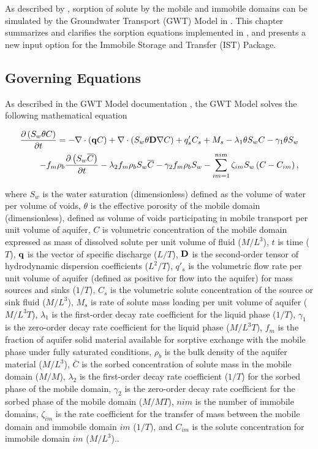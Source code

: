 
As described by \cite{modflow6gwt}, sorption of solute by the mobile and immobile domains can be simulated by the Groundwater Transport (GWT) Model in \mf.  This chapter summarizes and clarifies the sorption equations implemented in \mf, and presents a new input option for the Immobile Storage and Transfer (IST) Package.

\subsection{Governing Equations} \label{sec:goveqn1}

As described in the GWT Model documentation \citep{modflow6gwt},  the GWT Model solves the following mathematical equation

\begin{equation}
\label{eqn:gwtpde}
\begin{aligned}
\frac {\partial \left ( S_w \theta C \right )}{\partial t} = 
- \nabla \cdot \left ( \mathbf{q} C  \right ) 
+ \nabla \cdot \left ( S_w \theta \mathbf{D} \nabla C \right ) 
+ q'_s C_s + M_s  
- \lambda_1 \theta S_w C - \gamma_1 \theta S_w \\
- f_m \rho_b \frac {\partial \left ( S_w \overline{C} \right ) }{\partial t} 
- \lambda_2 f_m \rho_b S_w \overline{C} - \gamma_2 f_m \rho_b S_w 
- \sum \limits_{im=1}^{nim}  \zeta_{im} S_w \left ( C - C_{im} \right ),
\end{aligned}
\end{equation}

\noindent where $S_w$ is the water saturation (dimensionless) defined as the volume of water per volume of voids, $\theta$ is the effective porosity of the mobile domain (dimensionless), defined as volume of voids participating in mobile transport per unit volume of aquifer, $C$ is volumetric concentration of the mobile domain expressed as mass of dissolved solute per unit volume of fluid ($M/L^3$), $t$ is time ($T$), $\mathbf{q}$ is the vector of specific discharge ($L/T$), $\mathbf{D}$ is the second-order tensor of hydrodynamic dispersion coefficients ($L^2/T$), $q'_s$ is the volumetric flow rate per unit volume of aquifer (defined as positive for flow into the aquifer) for mass sources and sinks ($1/T$), $C_s$ is the volumetric solute concentration of the source or sink fluid ($M/L^3$), $M_s$ is rate of solute mass loading per unit volume of aquifer ($M/L^3T$), $\lambda_1$ is the first-order decay rate coefficient for the liquid phase ($1/T$), $\gamma_1$ is the zero-order decay rate coefficient for the liquid phase ($M/L^3T$), $f_m$ is the fraction of aquifer solid material available for sorptive exchange with the mobile phase under fully saturated conditions, $\rho_b$ is the bulk density of the aquifer material ($M/L^3$), $\overline{C}$ is the sorbed concentration of solute mass in the mobile domain ($M/M$), $\lambda_2$ is the first-order decay rate coefficient ($1/T$) for the sorbed phase of the mobile domain,  $\gamma_2$ is the zero-order decay rate coefficient for the sorbed phase of the mobile domain ($M/MT$), $nim$ is the number of immobile domains, $\zeta_{im}$ is the rate coefficient for the transfer of mass between the mobile domain and immobile domain $im$ ($1/T$), and $C_{im}$ is the solute concentration for immobile domain $im$ ($M/L^3$)..  

